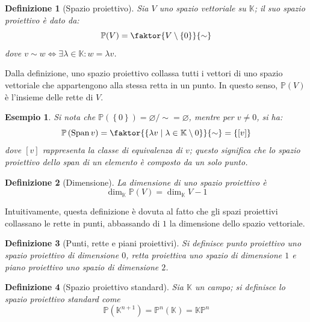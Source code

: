 \documentclass[11pt, a4paper]{scrartcl}
\theoremstyle{style1}
\newtheorem{definizione}{Definizione}[section]
\newtheorem{esempio}{Esempio}[section]
\numberwithin{equation}{subsection}
\begin{document}
\begin{definizione}
	[Spazio proiettivo]
	Sia $V$ uno spazio vettoriale su $\mathbb{K}$; il suo \textit{spazio proiettivo} \`e dato da:
	\[
		\mathbb{P}( V) = \faktor{V \setminus \left\{ 0 \right\} }{\sim}
	\] 
	dove $v\sim w \iff \exists \lambda \in \mathbb{K} : w = \lambda v$.
\end{definizione}
\noindent Dalla definizione, uno spazio proiettivo collassa tutti i vettori di uno spazio vettoriale che appartengono alla stessa retta in un punto.
In questo senso, $\mathbb{P} (V)$ \`e l'insieme delle rette di $V$.
\begin{esempio}
Si nota che $\mathbb{P} \left(\left\{ 0 \right\} \right) = \varnothing / {\sim} = \varnothing$, mentre per $v\neq 0$, si ha:
\[
	\mathbb{P}\left(\operatorname{Span} v\right) = \faktor{\left\{ \lambda v  \mid \lambda \in \mathbb{K}\setminus 0 \right\} }{\sim} = \left\{ \left[ v \right]  \right\} 
\] 
dove $\left[ v \right] $ rappresenta la classe di equivalenza di $v$; questo significa che lo spazio proiettivo dello span di un elemento \`e composto da un solo punto.
\end{esempio}
\begin{definizione}
	[Dimensione]
	La dimensione di uno spazio proiettivo \`e
	\[
	\dim_{\mathbb{K}} \mathbb{P}(V) = \dim_{\mathbb{K}} V - 1
	\] 
\end{definizione}
\noindent Intuitivamente, questa definizione \`e dovuta al fatto che gli spazi proiettivi collassano le rette in punti, abbassando di $1$ la dimensione dello spazio vettoriale.

\begin{definizione}
	[Punti, rette e piani proiettivi]
	Si definisce \textit{punto proiettivo} uno spazio proiettivo di dimensione $0$, \textit{retta proiettiva} uno spazio di dimensione $1$ e \textit{piano proiettivo} uno spazio di dimensione $2$.
\end{definizione}
\begin{definizione}
	[Spazio proiettivo standard]
	Sia $\mathbb{K}$ un campo; si definisce lo \textit{spazio proiettivo standard} come
	\[
	\mathbb{P}(\mathbb{K}^{n+1} ) = \mathbb{P}^n(\mathbb{K}) = \mathbb{K}\mathbb{P}^n
	\] 
\end{definizione}
\end{document}
